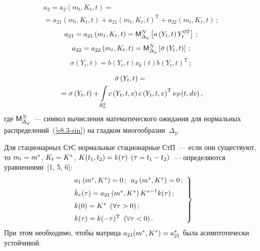 \begin{multicols}{2}
\vspace*{-12pt}

\noindent
   \begin{multline*}
    a_2 = a_2 \left(m_t, K_t, t\right) = {}\\
    {}=a_{21} \left(m_t, K_t, t\right)+ 
    a_{21} \left(m_t, K_t, t\right)^{\mathrm{T}} +a_{22}\left( m_t, K_t, t\right)\,;
    \end{multline*}
    $$
    a_{21} = a_{21}\left(m_t, K_t, t\right)=  
    {\sf M}_{\Delta_y}^N \left[ a\left(Y_t, t\right) Y_{t}^{0\mathrm{T}}\right] \,;
    $$
    $$
    a_{22} = a_{22}\left(m_t, K_t, t\right)= 
    {\sf M}_{\Delta_y}^N\left[  \bar\sigma \left(Y_t, t\right)\right]\,;
    $$
    $$
    \sigma \left(Y_t, t\right)=
    b\left(Y_t, t\right) \nu_0(t) b\left(Y_t, t\right)^{\mathrm{T}} \,;
    $$
    
    \vspace*{-12pt}
    
    \noindent
    \begin{multline}
    \bar\sigma \left(Y_t, t\right) = {}\\
    {}=\sigma \left(Y_t, t\right)+
    \int\limits_{R_0^q} c \left(Y_t, t, v\right) c\left(Y_t, t,v\right)^{\mathrm{T}} 
    \nu_P (t, dv)\,,\label{e8.5-sin}
    \end{multline}
где ${\sf M}_{\Delta_y}^N$~--- символ вычисления математического ожидания 
для нормальных распределений~(\ref{e8.3-sin}) на гладком многообразии~$\Delta_y$.

Для стационарных СтС нормальные стационарные СтП~--- если они
существуют, то  $m_t \hm= m^*$, $ K_t \hm= K^*$, $K(t_1, t_2)\hm =
k(\tau)$ $(\tau \hm= t_1\hm-t_2)$~--- определяются уравнениями~[1, 5, 6]:
  \begin{equation}
    \left.
    \begin{array}{l}
    a_1 \left(m^*, K^*\right) =0\,;\enskip a_2 \left(m^*, K^*\right)=0\,;
    \\[6pt]
       \dot k_\tau (\tau) = a_{21} \left(m^*, K^*\right) 
    {K^*}^{-1} k(\tau)\,;\\[6pt] 
    k(0) =K^* \enskip (\forall \tau >0)\,; \\[6pt] 
    k(\tau) = k(-\tau)^{\mathrm{T}} \enskip (\forall\tau <0)\,.
    \end{array}
    \right\}
    \label{e8.6-sin}
    \end{equation}
При этом необходимо, чтобы матрица  $a_{21} ( m^*, K^*)\hm= a^*_{21}$
 была асимптотически устойчивой.


\end{multicols}
